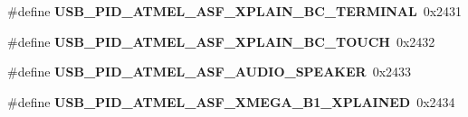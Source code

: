\begin{DoxyCompactItemize}
\item 
\hypertarget{group__usb__atmel__ids__group_gad0c62418cdc18878b60849412ab8bb23}{\#define {\bfseries U\-S\-B\-\_\-\-P\-I\-D\-\_\-\-A\-T\-M\-E\-L\-\_\-\-A\-S\-F\-\_\-\-X\-P\-L\-A\-I\-N\-\_\-\-B\-C\-\_\-\-T\-E\-R\-M\-I\-N\-A\-L}~0x2431}\label{group__usb__atmel__ids__group_gad0c62418cdc18878b60849412ab8bb23}

\item 
\hypertarget{group__usb__atmel__ids__group_ga37b99cc7bfd54bc7c3ffd687188e5437}{\#define {\bfseries U\-S\-B\-\_\-\-P\-I\-D\-\_\-\-A\-T\-M\-E\-L\-\_\-\-A\-S\-F\-\_\-\-X\-P\-L\-A\-I\-N\-\_\-\-B\-C\-\_\-\-T\-O\-U\-C\-H}~0x2432}\label{group__usb__atmel__ids__group_ga37b99cc7bfd54bc7c3ffd687188e5437}

\item 
\hypertarget{group__usb__atmel__ids__group_ga1b6bfaf7852043aabaff755db9b6c0eb}{\#define {\bfseries U\-S\-B\-\_\-\-P\-I\-D\-\_\-\-A\-T\-M\-E\-L\-\_\-\-A\-S\-F\-\_\-\-A\-U\-D\-I\-O\-\_\-\-S\-P\-E\-A\-K\-E\-R}~0x2433}\label{group__usb__atmel__ids__group_ga1b6bfaf7852043aabaff755db9b6c0eb}

\item 
\hypertarget{group__usb__atmel__ids__group_ga91ff45d2f9f01be7f423b074e5b66efc}{\#define {\bfseries U\-S\-B\-\_\-\-P\-I\-D\-\_\-\-A\-T\-M\-E\-L\-\_\-\-A\-S\-F\-\_\-\-X\-M\-E\-G\-A\-\_\-\-B1\-\_\-\-X\-P\-L\-A\-I\-N\-E\-D}~0x2434}\label{group__usb__atmel__ids__group_ga91ff45d2f9f01be7f423b074e5b66efc}

\end{DoxyCompactItemize}
